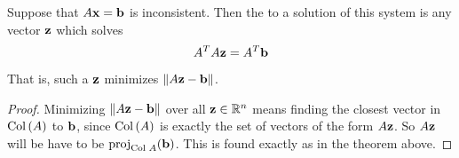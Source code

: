 \begin{corollary}
Suppose that $A\mathbf{x} = \mathbf{b}$ is inconsistent.  Then the
 to a solution of this system is
any vector $\mathbf{z}$ which solves
$$
A^TA \mathbf{z} = A^T \mathbf{b}
$$
That is, such a $\mathbf{z}$ minimizes $\Vert A\mathbf{z} - \mathbf{b} \Vert$.
\end{corollary}

\begin{proof}
Minimizing $\Vert A\mathbf{z} - \mathbf{b} \Vert$ over all $\mathbf{z} \in \mathbb{R}^n$
means finding the closest vector in $\operatorname{Col\,}(A)$ to $\mathbf{b}$,
since $\operatorname{Col\,}(A)$ is exactly the set of vectors of the form $A\mathbf{z}$.
So $A\mathbf{z}$ will be have to be $\operatorname{proj}_{\operatorname{Col\,} A}(\mathbf{b})$. This is found exactly as in the theorem above.
\end{proof}

